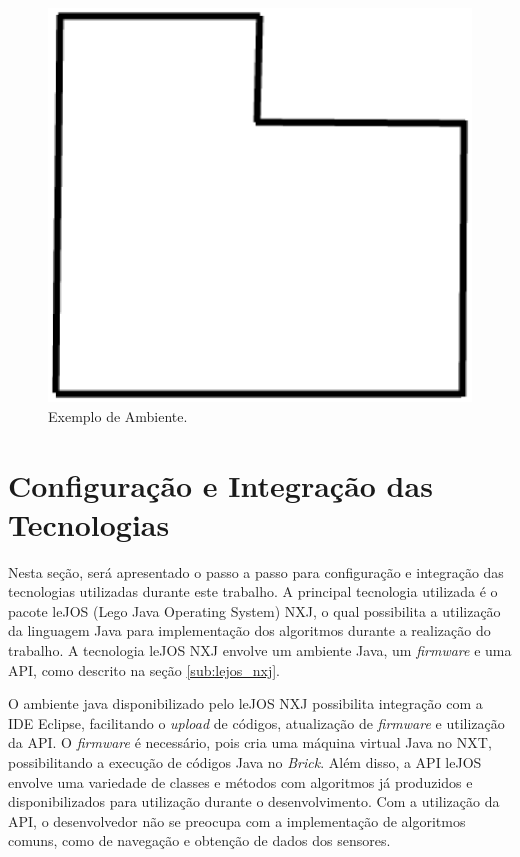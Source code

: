	\begin{figure}[H]
		\centering
		\includegraphics[scale=0.5]{figuras/exemplo_ambiente.eps}
		\caption[Exemplo de Ambiente]{Exemplo de Ambiente.}
		\label{img:exemplo_ambiente}
	\end{figure}

\section{Configuração e Integração das Tecnologias}

Nesta seção, será apresentado o passo a passo para configuração e integração das tecnologias utilizadas durante este trabalho. A principal tecnologia utilizada é o pacote leJOS (Lego Java Operating System) NXJ, o qual possibilita a utilização da linguagem Java para implementação dos algoritmos durante a realização do trabalho.
A tecnologia leJOS NXJ envolve um ambiente Java, um \textit{firmware} e uma API, como descrito na seção \ref{sub:lejos_nxj}.

O ambiente java disponibilizado pelo leJOS NXJ possibilita integração com a IDE Eclipse, facilitando o \textit{upload} de códigos, atualização de \textit{firmware} e utilização da API. O \textit{firmware} é necessário, pois cria uma máquina virtual Java no NXT, possibilitando a execução de códigos Java no \textit{Brick}.
Além disso, a API leJOS envolve uma variedade de classes e métodos com algoritmos já produzidos e disponibilizados para utilização durante o desenvolvimento. Com a utilização da API, o desenvolvedor não se preocupa com a implementação de algoritmos comuns, como de navegação e obtenção de dados dos sensores.

